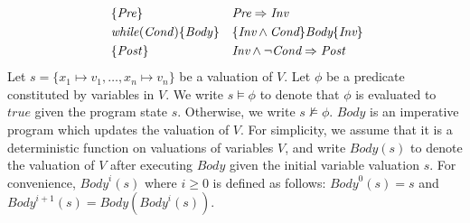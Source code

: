 \begin{align}
&\{\mathit{Pre}\} & & \emph{Pre} \Rightarrow \emph{Inv} \label{org:inv:pre}\\
&\mathit{while} (\mathit{Cond}) \{ \mathit{Body} \} && \{\emph{Inv} \wedge \emph{Cond}\} \emph{Body} \{\emph{Inv}\} \label{org:inv:loop}\\\
&\{\mathit{Post}\} & & \emph{Inv} \wedge \neg \emph{Cond} \Rightarrow \emph{Post} \label{org:inv:post}
\end{align}
Let $s = \{ x_1 \mapsto v_1, \ldots, x_n \mapsto v_n \}$ be a valuation of $V$. Let $\phi$ be a predicate constituted by variables in $V$. We write $s \models \phi$ to denote that $\phi$ is evaluated to $\mathit{true}$ given the program state $s$. Otherwise, we write $s \not \models \phi$. 
$\mathit{Body}$ is an imperative program which updates the valuation of $V$. For simplicity, we assume that it is a deterministic function on valuations of variables $V$, and write $\mathit{Body}(s)$ to denote the valuation of $V$ after executing $\mathit{Body}$ given the initial variable valuation $s$. For convenience, $\mathit{Body}^i(s)$ where $i \geq 0$ is defined as follows: $\mathit{Body}^0(s) = s$ and $\mathit{Body}^{i+1}(s) = \mathit{Body}(\mathit{Body}^i(s))$.

